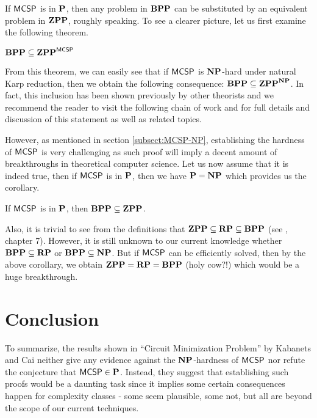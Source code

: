 \documentclass[11pt]{article}
\begin{document}
If $\mathprob{MCSP}$ is in $\P$, then any problem in $\BPP$ can be substituted by an equivalent problem in $\ZPP$, roughly speaking. To see a clearer picture, let us first examine the following theorem.

\begin{theorem}[\cite{10.1145/335305.335314}]
	$\BPP \subseteq \ZPP^{\mathprob{MCSP}}$
\end{theorem}

From this theorem, we can easily see that if $\mathprob{MCSP}$ is $\NP$-hard under natural Karp reduction, then we obtain the following consequence: $\BPP \subseteq \ZPP^{\NP}$. In fact, this inclusion has been shown previously by other theorists and we recommend the reader to visit the following chain of work \cite{10.1145/800061.808762} \cite{Zachos1986ADC} \cite{LAUTEMANN1983215} \cite{NISAN1994149} and \cite{article} for full details and discussion of this statement as well as related topics.

However, as mentioned in section \ref{subsect:MCSP-NP}, establishing the hardness of $\mathprob{MCSP}$ is very challenging as such proof will imply a decent amount of breakthroughs in theoretical computer science. Let us now assume that it is indeed true, then if $\mathprob{MCSP}$ is in $\P$, then we have $\P = \NP$ which provides us the corollary.

\begin{corollary}
	If $\mathprob{MCSP}$ is in $\P$, then $\BPP \subseteq \ZPP$.
\end{corollary}

Also, it is trivial to see from the definitions that $\ZPP \subseteq \RP \subseteq \BPP$ (see \cite{arora2009}, chapter 7). However, it is still unknown to our current knowledge whether $\BPP \subseteq \RP$ or $\BPP \subseteq \NP$. But if $\mathprob{MCSP}$ can be efficiently solved, then by the above corollary, we obtain $\ZPP = \RP = \BPP$ (holy cow?!) which would be a huge breakthrough.
 
\section{Conclusion}


To summarize, the results shown in ``Circuit Minimization Problem'' by Kabanets and Cai neither give any evidence against the $\NP$-hardness of $\mathprob{MCSP}$ nor refute the conjecture that $\mathprob{MCSP} \in \P$. Instead, they suggest that establishing such proofs would be a daunting task since it implies some certain consequences happen for complexity classes - some seem plausible, some not, but all are beyond the scope of our current techniques.
\end{document}
